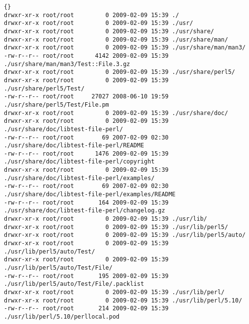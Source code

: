 \begin{lstlisting}[frame=trbl,label=cl:debs_cpan:dpkg-contents,caption=dpkg {-}{-}contents libtest-file-perl output]{}
drwxr-xr-x root/root         0 2009-02-09 15:39 ./
drwxr-xr-x root/root         0 2009-02-09 15:39 ./usr/
drwxr-xr-x root/root         0 2009-02-09 15:39 ./usr/share/
drwxr-xr-x root/root         0 2009-02-09 15:39 ./usr/share/man/
drwxr-xr-x root/root         0 2009-02-09 15:39 ./usr/share/man/man3/
-rw-r--r-- root/root      4142 2009-02-09 15:39 ./usr/share/man/man3/Test::File.3.gz
drwxr-xr-x root/root         0 2009-02-09 15:39 ./usr/share/perl5/
drwxr-xr-x root/root         0 2009-02-09 15:39 ./usr/share/perl5/Test/
-rw-r--r-- root/root     27027 2008-06-10 19:59 ./usr/share/perl5/Test/File.pm
drwxr-xr-x root/root         0 2009-02-09 15:39 ./usr/share/doc/
drwxr-xr-x root/root         0 2009-02-09 15:39 ./usr/share/doc/libtest-file-perl/
-rw-r--r-- root/root        69 2007-02-09 02:30 ./usr/share/doc/libtest-file-perl/README
-rw-r--r-- root/root      1476 2009-02-09 15:39 ./usr/share/doc/libtest-file-perl/copyright
drwxr-xr-x root/root         0 2009-02-09 15:39 ./usr/share/doc/libtest-file-perl/examples/
-rw-r--r-- root/root        69 2007-02-09 02:30 ./usr/share/doc/libtest-file-perl/examples/README
-rw-r--r-- root/root       164 2009-02-09 15:39 ./usr/share/doc/libtest-file-perl/changelog.gz
drwxr-xr-x root/root         0 2009-02-09 15:39 ./usr/lib/
drwxr-xr-x root/root         0 2009-02-09 15:39 ./usr/lib/perl5/
drwxr-xr-x root/root         0 2009-02-09 15:39 ./usr/lib/perl5/auto/
drwxr-xr-x root/root         0 2009-02-09 15:39 ./usr/lib/perl5/auto/Test/
drwxr-xr-x root/root         0 2009-02-09 15:39 ./usr/lib/perl5/auto/Test/File/
-rw-r--r-- root/root       195 2009-02-09 15:39 ./usr/lib/perl5/auto/Test/File/.packlist
drwxr-xr-x root/root         0 2009-02-09 15:39 ./usr/lib/perl/
drwxr-xr-x root/root         0 2009-02-09 15:39 ./usr/lib/perl/5.10/
-rw-r--r-- root/root       214 2009-02-09 15:39 ./usr/lib/perl/5.10/perllocal.pod
\end{lstlisting}

